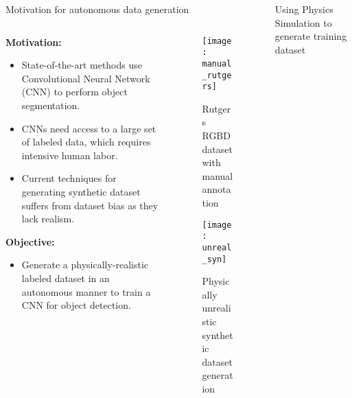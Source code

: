 \begin{columns}[t]
	\begin{column}{0.50\textwidth}
		\begin{block}{\large Motivation for autonomous data generation}
		    	\begin{columns}[T]
		    		\centering
		    		\begin{column}{0.60\textwidth}
					    {\bf \quad Motivation:}
					    \begin{itemize}
						    \item State-of-the-art methods use Convolutional Neural Network (CNN) to perform object segmentation.
						    \item CNNs need access to a large set of labeled data, which requires intensive human labor.
						    \item Current techniques for generating synthetic dataset suffers from dataset bias as they lack realism.
					    \end{itemize}
					    \vspace{0.8in}
					    {\bf\quad Objective:}
					    \begin{itemize}
					    \item Generate a physically-realistic labeled dataset in an autonomous manner to train a CNN for object detection.
					    \end{itemize}
					\end{column}
					\begin{column}{0.40\textwidth}
						\centering
						\vspace{-0.2in}
						\begin{figure}[h]
							\texttt{[image: manual\_rutgers]}
							\vspace{0.1in}
							\caption{Rutgers RGBD dataset with manual annotation}
						\end{figure}
						\vspace{0.3in}
						\begin{figure}[h]
							\texttt{[image: unreal\_syn]}
							\vspace{0.1in}
							\caption{Physically unrealistic synthetic dataset generation}
						\end{figure}
					\end{column}
				\end{columns}
		\end{block}
	\end{column}
	\begin{column}{0.50\textwidth}
		\begin{block}{\large Using Physics Simulation to generate training dataset}

\end{block}
\end{column}
\end{columns}
